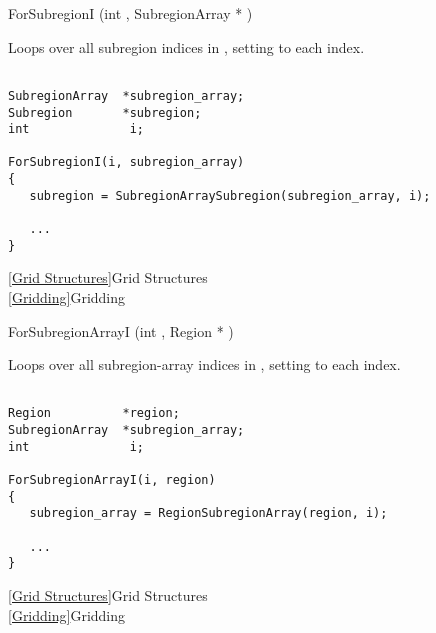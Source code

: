 {\newpage\clearpage
{}%
\begin{defmac} ForSubregionI (int , {SubregionArray *} )
\par
\DESCRIPTION
Loops over all subregion indices in , setting
 to each index.
\par
\EXAMPLE
\mbox{}
\begin{display}\begin{verbatim}

SubregionArray  *subregion_array;
Subregion       *subregion;
int              i;

ForSubregionI(i, subregion_array)
{
   subregion = SubregionArraySubregion(subregion_array, i);

   ...
}\end{verbatim}
\end{display}
\par
\SEEALSO
\vref{Grid Structures}{Grid Structures}\\
\vref{Gridding}{Gridding}
\par
\end{defmac}%
\lthtmlfigureZ
\lthtmlcheckvsize\clearpage}

{\newpage\clearpage
{}%
\begin{defmac} ForSubregionArrayI (int , {Region *} )
\par
\DESCRIPTION
Loops over all subregion-array indices in , setting
 to each index.
\par
\EXAMPLE
\mbox{}
\begin{display}\begin{verbatim}

Region          *region;
SubregionArray  *subregion_array;
int              i;

ForSubregionArrayI(i, region)
{
   subregion_array = RegionSubregionArray(region, i);

   ...
}\end{verbatim}
\end{display}
\par
\SEEALSO
\vref{Grid Structures}{Grid Structures}\\
\vref{Gridding}{Gridding}
\par
\end{defmac}%
\lthtmlfigureZ
\lthtmlcheckvsize\clearpage}

